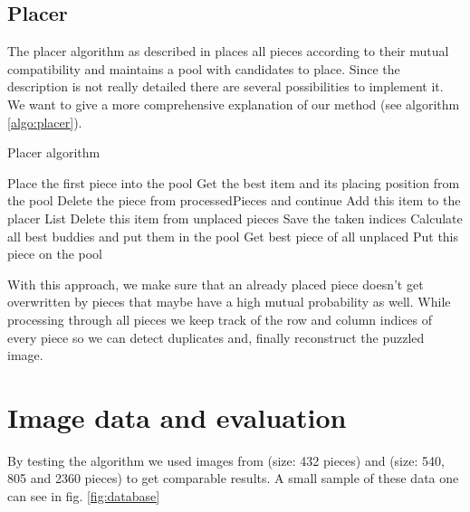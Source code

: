 \documentclass[11pt]{report}
\begin{document}
\subsection{Placer}
The placer algorithm as described in \cite{Paikin2015} places all pieces according to their mutual compatibility and maintains a pool with candidates to place. Since the description is not really detailed there are several possibilities to implement it. We want to give a more comprehensive explanation of our method (see algorithm \ref{algo:placer}).

\begin{algorithm}
	\caption{Placer algorithm}
	\label{algo:placer}
	\begin{algorithmic}
		\State Place the first piece into the pool
				\State Get the best item and its placing position from the pool
					\State Delete the piece from processedPieces and continue \EndIf
				\State Add this item to the placer List
				\State Delete this item from unplaced pieces
				\State Save the taken indices
				\State Calculate all best buddies and put them in the pool
			\EndWhile
		\State Get best piece of all unplaced
			\State Put this piece on the pool
		\EndIf
		\EndWhile
	\end{algorithmic}
\end{algorithm}

With this approach, we make sure that an already placed piece doesn't get overwritten by pieces that maybe have a high mutual probability as well. While processing through all pieces we keep track of the row and column indices of every piece so we can detect duplicates and, finally reconstruct the puzzled image.
\newpage

\section{Image data and evaluation}
By testing the algorithm we used images from \cite{Cho2010} (size: 432 pieces) and \cite{Pomeranz2011} (size: 540, 805 and 2360 pieces) to get comparable results. A small sample of these data one can see in fig. \ref{fig:database}
\end{document}
